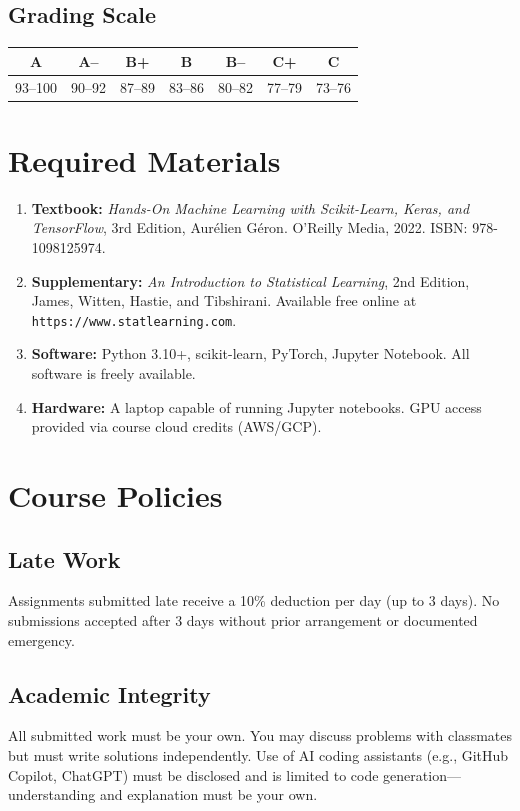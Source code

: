 \documentclass[
    language=english,
    doctype=curriculum,
    institution=none,
]{../../omnilatex}
\begin{document}
\subsection{Grading Scale}

\begin{center}
\begin{tabular}{|c|c|c|c|c|c|c|}
\hline
\textbf{A} & \textbf{A--} & \textbf{B+} & \textbf{B} & \textbf{B--} & \textbf{C+} & \textbf{C} \\
\hline
93--100 & 90--92 & 87--89 & 83--86 & 80--82 & 77--79 & 73--76 \\
\hline
\end{tabular}
\end{center}

\section{Required Materials}

\begin{enumerate}
    \item \textbf{Textbook:} \emph{Hands-On Machine Learning with Scikit-Learn, Keras, and TensorFlow}, 3rd Edition, Aur\'{e}lien G\'{e}ron. O'Reilly Media, 2022. ISBN: 978-1098125974.
    \item \textbf{Supplementary:} \emph{An Introduction to Statistical Learning}, 2nd Edition, James, Witten, Hastie, and Tibshirani. Available free online at \texttt{https://www.statlearning.com}.
    \item \textbf{Software:} Python 3.10+, scikit-learn, PyTorch, Jupyter Notebook. All software is freely available.
    \item \textbf{Hardware:} A laptop capable of running Jupyter notebooks. GPU access provided via course cloud credits (AWS/GCP).
\end{enumerate}

\section{Course Policies}

\subsection{Late Work}
Assignments submitted late receive a 10\% deduction per day (up to 3 days). No submissions accepted after 3 days without prior arrangement or documented emergency.

\subsection{Academic Integrity}
All submitted work must be your own. You may discuss problems with classmates but must write solutions independently. Use of AI coding assistants (e.g., GitHub Copilot, ChatGPT) must be disclosed and is limited to code generation---understanding and explanation must be your own.
\end{document}
